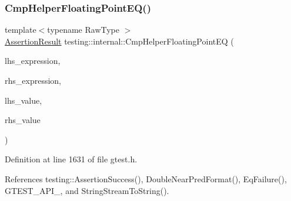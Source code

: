 \subsubsection{\texorpdfstring{Cmp\+Helper\+Floating\+Point\+E\+Q()}{CmpHelperFloatingPointEQ()}}
{\footnotesize\ttfamily template$<$typename Raw\+Type $>$ \\
\hyperlink{classtesting_1_1AssertionResult}{Assertion\+Result} testing\+::internal\+::\+Cmp\+Helper\+Floating\+Point\+EQ (\begin{DoxyParamCaption}\item[{const char $\ast$}]{lhs\+\_\+expression,  }\item[{const char $\ast$}]{rhs\+\_\+expression,  }\item[{Raw\+Type}]{lhs\+\_\+value,  }\item[{Raw\+Type}]{rhs\+\_\+value }\end{DoxyParamCaption})}



Definition at line 1631 of file gtest.\+h.



References testing\+::\+Assertion\+Success(), Double\+Near\+Pred\+Format(), Eq\+Failure(), G\+T\+E\+S\+T\+\_\+\+A\+P\+I\+\_\+, and String\+Stream\+To\+String().


